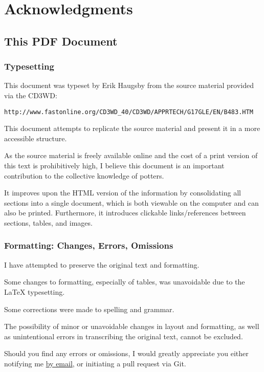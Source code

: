 \chapter*{Acknowledgments}
\section*{This PDF Document}
\subsection*{Typesetting}
This document was typeset by Erik Haugsby from the source material provided 
via the CD3WD:
\begin{verbatim}
http://www.fastonline.org/CD3WD_40/CD3WD/APPRTECH/G17GLE/EN/B483.HTM
\end{verbatim}
This document attempts to replicate the source material and present it in a 
more accessible structure.

As the source material is freely available online and the cost of a print 
version of this text is prohibitively high, I believe this document is an 
important contribution to the collective knowledge of potters. 

It improves upon the HTML version of the information by consolidating all 
sections into a single document, which is both viewable on the computer and can 
also be printed. Furthermore, it introduces clickable links/references between 
sections, tables, and images.
\subsection*{Formatting: Changes, Errors, Omissions}
I have attempted to preserve the original text and formatting. 

Some changes to formatting, especially of tables, was unavoidable due to the 
LaTeX typesetting.

Some corrections were made to spelling and grammar.

The possibility of minor or unavoidable changes in layout and formatting, as 
well as unintentional errors in transcribing the original text, cannot be 
excluded.

Should you find any errors or omissions, I would greatly appreciate you either 
notifying me \href{mailto:e@erikhaugsby.com}{by email}, or initiating a pull 
request via Git. 


